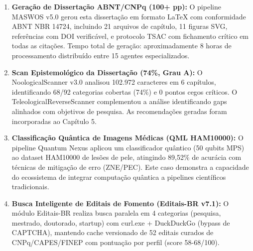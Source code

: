 \begin{enumerate}
  \item \textbf{Geração de Dissertação ABNT/CNPq (100+ pp):} O pipeline MASWOS v5.0 gerou esta dissertação em formato LaTeX com conformidade ABNT NBR 14724, incluindo 21 arquivos de capítulo, 11 figuras SVG, referências com DOI verificável, e protocolo TSAC com fichamento crítico em todas as citações. Tempo total de geração: aproximadamente 8 horas de processamento distribuído entre 15 agentes especializados.

  \item \textbf{Scan Epistemológico da Dissertação (74\%, Grau A):} O NoologicalScanner v3.0 analisou 102.972 caracteres em 6 capítulos, identificando 68/92 categorias cobertas (74\%) e 0 pontos cegos críticos. O TeleologicalReverseScanner complementou a análise identificando gaps alinhados com objetivos de pesquisa. As recomendações geradas foram incorporadas ao Capítulo 5.

  \item \textbf{Classificação Quântica de Imagens Médicas (QML HAM10000):} O pipeline Quantum Nexus aplicou um classificador quântico (50 qubits MPS) ao dataset HAM10000 de lesões de pele, atingindo 89,52\% de acurácia com técnicas de mitigação de erro (ZNE/PEC). Este caso demonstra a capacidade do ecossistema de integrar computação quântica a pipelines científicos tradicionais.

  \item \textbf{Busca Inteligente de Editais de Fomento (Editais-BR v7.1):} O módulo Editais-BR realiza busca paralela em 4 categorias (pesquisa, mestrado, doutorado, startup) com curl.exe + DuckDuckGo (bypass de CAPTCHA), mantendo cache versionado de 52 editais curados de CNPq/CAPES/FINEP com pontuação por perfil (score 58-68/100).
\end{enumerate}

\newpage
